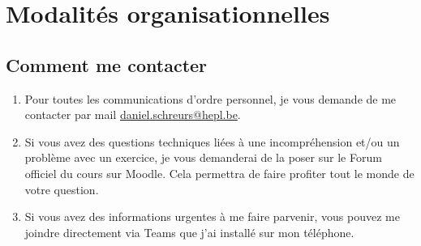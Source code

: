\section{Modalités organisationnelles}
\subsection{Comment me contacter}
\begin{enumerate}
    \item Pour toutes les communications d'ordre personnel, je vous demande de me contacter par mail \href{mailto:daniel.schreurs@hepl.be}{daniel.schreurs@hepl.be}.
    \item Si vous avez des questions techniques liées à une incompréhension et/ou un problème avec un exercice, je vous demanderai de la poser sur le Forum officiel du cours sur Moodle. Cela permettra de faire profiter tout le monde de votre question.
    \item Si vous avez des informations urgentes à me faire parvenir, vous pouvez me joindre directement via Teams que j'ai installé sur mon téléphone.
\end{enumerate}


\clearpage
\printbibliography


